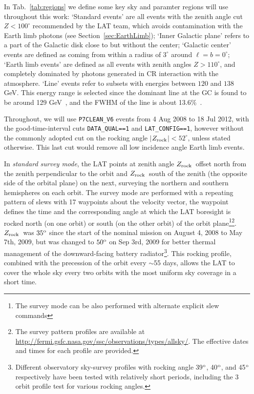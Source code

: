 \documentclass[aps,twocolumn,prd,superscriptaddress,showpacs,nofootinbib,fixfloat]{revtex4}
\newcommand{\degree}{^{\rm o}}
\newcommand{\zrock}{$Z_{\rm rock}$}
\begin{document}
In Tab.~\ref{tab:regions} we define some key sky and
paramter regions %
will use throughout this work: `Standard events' are all
events with the zenith angle cut $Z<100^\circ$ recommended
by the LAT team, which avoids contamination with the Earth
limb photons (see Section~\ref{sec:EarthLimb}); `Inner
Galactic plane' refers to a part of the Galactic disk close
to but without the center; `Galactic center' events are
defined as coming from within a radius of $3^\circ$ around
$\ell=b=0^\circ$; `Earth limb events' are defined as all
events with zenith angles $Z>110^\circ$, and completely
dominated by photons generated in CR interaction with the
atmosphere. `Line' events refer to subsets with energies
between $120$ and $138$ GeV. This energy range is selected
since the dominant line at the GC is found to be around 129
GeV~\cite{linepaper}, and the FWHM of the line is about
13.6\%~\cite{Weniger:2012}.

Throughout, we will use \texttt{P7CLEAN\_V6} events from 4
Aug 2008 to 18 Jul 2012, with the good-time-interval cuts
\texttt{DATA\_QUAL==1} and \texttt{LAT\_CONFIG==1}, however
without the commonly adopted cut on the rocking angle
$|$\zrock$|<52^\circ$, unless stated otherwise. This last cut would remove
all low incidence angle Earth limb events.
\medskip

In \emph{standard survey mode}, the LAT points at zenith
angle \zrock\ offset north from the zenith perpendicular to
the orbit and \zrock\ south of the zenith (the opposite side
of the orbital plane) on the next, surveying the northern
and southern hemispheres on each orbit. The survey mode are
performed with a repeating pattern of slews with 17
waypoints about the velocity vector, the waypoint defines
the time and the corresponding angle at which the LAT
boresight is rocked north (on one orbit) or south (on the
other orbit) of the orbit plane\footnote{The survey mode can
be also performed with alternate explicit slew
commands}\footnote{The survey pattern profiles are available
at
\url{http://fermi.gsfc.nasa.gov/ssc/observations/types/allsky/}.
The effective dates and times for each profile are provided.
}. \zrock\ was $35\degree$ since the start of the nominal
mission on August 4, 2008 to May 7th, 2009, but was changed
to $50\degree$ on Sep 3rd, 2009 for better thermal
management of the downward-facing battery
radiator\footnote{Different observatory sky-survey profiles
with rocking angle 39$\degree$, 40$\degree$, and 45$\degree$
respectively have been tested with relatively short periods,
including the 3 orbit profile test for various rocking
angles.}. This rocking profile, combined with the precession
of the orbit every $\sim$55 days, allows the LAT to cover
the whole sky every two orbits with the most uniform sky
coverage in a short time.
\end{document}
